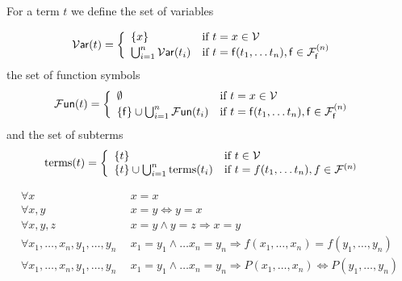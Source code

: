 
\begin{definition}For a term $t$ we define the set of variables
	
	\begin{align*}
		\operatorname{\mathcal{V}\mathsf{ar}}(t) &= \left\{\begin{array}{ll}
			\{ x \} & \text{if } t = x \in {\mathcal V} \\
			\bigcup_{i=1}^n \operatorname{\mathcal{V}\mathsf{ar}}(t_i) & \text{if }  t = {\mathsf f}(t_1, \ldots t_n), {\mathsf f} \in {{\mathcal F}^{(n)}_{\mathsf f}}
		\end{array}\right.	
	\end{align*}
	the set of function symbols
	\begin{align*}
	\operatorname{\mathcal{F}\mathsf{un}}(t) &= \left\{\begin{array}{ll}
	\emptyset & \text{if } t = x \in {\mathcal V} \\
	\{ {\mathsf f} \} \cup \bigcup_{i=1}^n \operatorname{\mathcal{F}\mathsf{un}}(t_i) & \text{if }  t = {\mathsf f}(t_1, \ldots t_n), {\mathsf f} \in {{\mathcal F}^{(n)}_{\mathsf f}}
	\end{array}\right.	
	\end{align*}
	and the set of subterms
	\begin{align*}
	\operatorname{terms}(t) &= \left\{\begin{array}{ll}
	\{ t \} & \text{if } t \in {\mathcal V} \\
	\{ t \} \cup \bigcup_{i=1}^n \operatorname{terms}(t_i) & \text{if }  t = f(t_1, \ldots t_n), f \in {\mathcal F}^{(n)}
	\end{array}\right.	
	\end{align*}
	
\end{definition}


	\begin{align*}
	\forall x\ &\ x = x \\
	\forall x,y\ &\ x = y \Leftrightarrow y = x \\
	\forall x,y,z\ &\ x = y \land y = z \Rightarrow x = y \\
	\forall x_1,\ldots,x_n,y_1,\ldots,y_n\ &\ x_1=y_1\land\ldots x_n=y_n\Rightarrow f(x_1,\ldots,x_n)=f(y_1,\ldots,y_n) \\
	\forall x_1,\ldots,x_n,y_1,\ldots,y_n\ &\ x_1=y_1\land\ldots x_n=y_n\Rightarrow P(x_1,\ldots,x_n)\Leftrightarrow P(y_1,\ldots,y_n) \\
	\end{align*}


